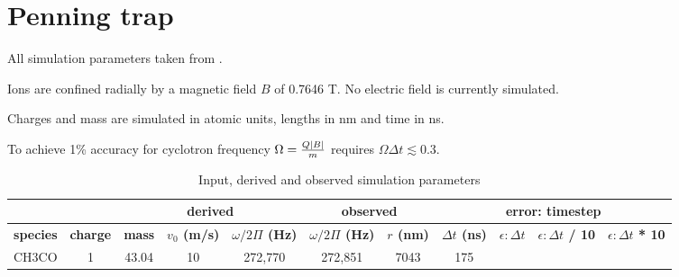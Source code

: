 \documentclass[10pt,conference,onecolumn]{IEEEtran}
\begin{document}
\section{Penning trap}

All simulation parameters taken from \cite{Han1997}.

Ions are confined radially by a magnetic field $B$ of 0.7646 T.
No electric field is currently simulated.

Charges and mass are simulated in atomic units, lengths in nm and time in ns.

To achieve 1\% accuracy for cyclotron frequency $\Omega = {Q|B| \over m}$  requires $\Omega \Delta t \lesssim 0.3$\cite{Birdsall1985}.

\begin{table}[htbp]
 \centering	  	  
 \caption{Input, derived and observed simulation parameters}
\label{tab:params}
\begin{tabular}{c|c|c|c|c|c|c|c|c|c|c}
 \hline \hline
  &  & \multicolumn{3}{|c|}{\textbf{derived}} & \multicolumn{2}{|c|}{\textbf{observed}} & \multicolumn{4}{|c|}{\textbf{error: timestep}} \\ 
 \hline
 \textbf{species} & \textbf{charge} & \textbf{mass} & \textbf{$v_0$ (m/s)} & \textbf{$\omega / 2\Pi$ (Hz)} & \textbf{$\omega / 2\Pi$ (Hz)}  & \textbf{$r$ (nm)} & \textbf{$\Delta t$ (ns)} & \textbf{$\epsilon: \Delta t$}& \textbf{$\epsilon: \Delta t$ / 10} & \textbf{$\epsilon: \Delta t$ * 10}\\ 
 \hline
 CH3CO & 1 & 43.04 & 10 & 272,770 & 272,851 & 7043 & 175 & \\
 \hline \hline
\end{tabular}
\end{table}



\end{document}
